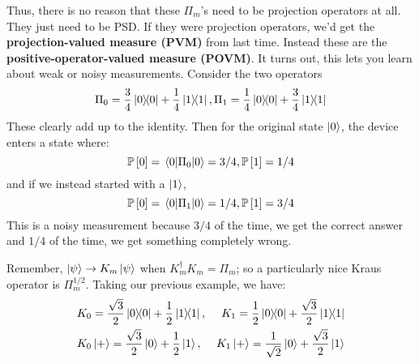 Thus, there is no reason that these $\Pi_m$'s need to be projection operators at all. They just need to be PSD. If they were projection operators,
we'd get the \textbf{projection-valued measure (PVM)} from last time. Instead these are the \textbf{positive-operator-valued measure (POVM)}. It turns out,
this lets you learn about weak or noisy measurements. Consider the two operators
\[ \Pi_0 = \frac{3}{4} \ketbra{0} + \frac{1}{4} \ketbra{1}, \Pi_1 = \frac{1}{4} \ketbra{0} + \frac{3}{4} \ketbra{1} \]
These clearly add up to the identity. Then for the original state $\ket{0}$, the device enters a state where:
\[ \mathbb{P}\left[ 0 \right] = \mel{0}{\Pi_0}{0} = 3/4, \mathbb{P}\left[ 1 \right] = 1/4 \]
and if we instead started with a $\ket{1}$,
\[ \mathbb{P}\left[ 0 \right] = \mel{0}{\Pi_1}{0} = 1/4, \mathbb{P}\left[ 1 \right] = 3/4 \]
This is a noisy measurement because $3/4$ of the time, we get the correct answer and $1/4$ of the time, we get something completely wrong.

Remember, $\ket{\psi} \to K_m \ket{\psi}$ when $K_m^{\dagger} K_m = \Pi_m$; so a particularly nice Kraus operator
is $\Pi_m^{1/2}$. Taking our previous example, we have:
\begin{align*}
    &K_0 = \frac{\sqrt{3}}{2} \ketbra{0}{0} + \frac{1}{2} \ketbra{1}{1}, &K_1 = \frac{1}{2} \ketbra{0}{0} + \frac{\sqrt{3}}{2} \ketbra{1}{1}  \\
    &K_0 \ket{+} = \frac{\sqrt{3}}{2} \ket{0} + \frac{1}{2} \ket{1}, &K_1 \ket{+} = \frac{1}{\sqrt{2}} \ket{0} + \frac{\sqrt{3}}{2} \ket{1}
\end{align*}